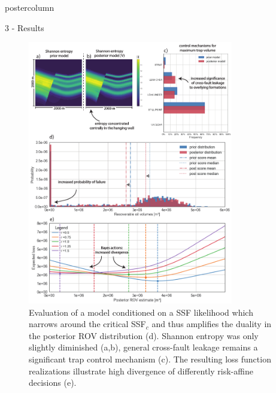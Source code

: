 \documentclass{beamer}
\begin{document}
\begin{frame}
\begin{columns}
\begin{column}{.499\textwidth}
\begin{beamercolorbox}[center]{postercolumn}
\begin{minipage}{.98\textwidth}
{\begin{myblock}{3 - Results}
\begin{figure}
\begin{minipage}{0.98\textwidth}
			\begin{minipage}[t]{0.49\textwidth}
				\centering\includegraphics[width=0.8\textwidth]{figures/ML5}
				\caption{Evaluation of a model conditioned on a SSF likelihood which narrows around the critical SSF$_c$ and thus amplifies the duality in the posterior ROV distribution (d). Shannon entropy was only slightly diminished (a,b), general cross-fault leakage remains a significant trap control mechanism (c). The resulting loss function realizations illustrate high divergence of differently risk-affine decisions (e).}
				\label{fig:ML5}
			\end{minipage}	
		\end{minipage}
	\end{figure}
	

\end{myblock}}
\end{minipage}
\end{beamercolorbox}
\end{column}
\end{columns}
\end{frame}
\end{document}
